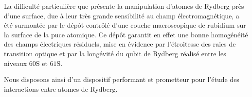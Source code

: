 La difficulté particulière que présente la manipulation d'atomes de Rydberg près d'une surface, due à leur très grande sensibilité au champ électromagnétique, a été surmontée par le dépôt contrôlé d'une couche macroscopique de rubidium sur la surface de la puce atomique.
Ce dépôt garantit en effet une bonne homogénéité des champs électriques résiduels, mise en évidence par l'étroitesse des raies de transition optique et par la longévité du qubit de Rydberg réalisé entre les niveaux $\mathrm{60S}$ et $\mathrm{61S}$.

Nous disposons ainsi 
d'un dispositif performant et prometteur pour l'étude des interactions entre atomes de Rydberg.
